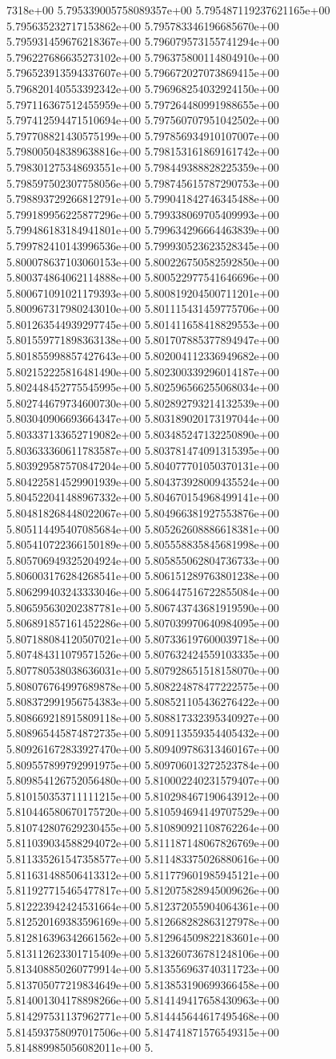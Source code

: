 7318e+00	5.795339005758089357e+00	5.795487119237621165e+00	5.795635232717153862e+00	5.795783346196685670e+00	5.795931459676218367e+00	5.796079573155741294e+00	5.796227686635273102e+00	5.796375800114804910e+00	5.796523913594337607e+00	5.796672027073869415e+00	5.796820140553392342e+00	5.796968254032924150e+00	5.797116367512455959e+00	5.797264480991988655e+00	5.797412594471510694e+00	5.797560707951042502e+00	5.797708821430575199e+00	5.797856934910107007e+00	5.798005048389638816e+00	5.798153161869161742e+00	5.798301275348693551e+00	5.798449388828225359e+00	5.798597502307758056e+00	5.798745615787290753e+00	5.798893729266812791e+00	5.799041842746345488e+00	5.799189956225877296e+00	5.799338069705409993e+00	5.799486183184941801e+00	5.799634296664463839e+00	5.799782410143996536e+00	5.799930523623528345e+00	5.800078637103060153e+00	5.800226750582592850e+00	5.800374864062114888e+00	5.800522977541646696e+00	5.800671091021179393e+00	5.800819204500711201e+00	5.800967317980243010e+00	5.801115431459775706e+00	5.801263544939297745e+00	5.801411658418829553e+00	5.801559771898363138e+00	5.801707885377894947e+00	5.801855998857427643e+00	5.802004112336949682e+00	5.802152225816481490e+00	5.802300339296014187e+00	5.802448452775545995e+00	5.802596566255068034e+00	5.802744679734600730e+00	5.802892793214132539e+00	5.803040906693664347e+00	5.803189020173197044e+00	5.803337133652719082e+00	5.803485247132250890e+00	5.803633360611783587e+00	5.803781474091315395e+00	5.803929587570847204e+00	5.804077701050370131e+00	5.804225814529901939e+00	5.804373928009435524e+00	5.804522041488967332e+00	5.804670154968499141e+00	5.804818268448022067e+00	5.804966381927553876e+00	5.805114495407085684e+00	5.805262608886618381e+00	5.805410722366150189e+00	5.805558835845681998e+00	5.805706949325204924e+00	5.805855062804736733e+00	5.806003176284268541e+00	5.806151289763801238e+00	5.806299403243333046e+00	5.806447516722855084e+00	5.806595630202387781e+00	5.806743743681919590e+00	5.806891857161452286e+00	5.807039970640984095e+00	5.807188084120507021e+00	5.807336197600039718e+00	5.807484311079571526e+00	5.807632424559103335e+00	5.807780538038636031e+00	5.807928651518158070e+00	5.808076764997689878e+00	5.808224878477222575e+00	5.808372991956754383e+00	5.808521105436276422e+00	5.808669218915809118e+00	5.808817332395340927e+00	5.808965445874872735e+00	5.809113559354405432e+00	5.809261672833927470e+00	5.809409786313460167e+00	5.809557899792991975e+00	5.809706013272523784e+00	5.809854126752056480e+00	5.810002240231579407e+00	5.810150353711111215e+00	5.810298467190643912e+00	5.810446580670175720e+00	5.810594694149707529e+00	5.810742807629230455e+00	5.810890921108762264e+00	5.811039034588294072e+00	5.811187148067826769e+00	5.811335261547358577e+00	5.811483375026880616e+00	5.811631488506413312e+00	5.811779601985945121e+00	5.811927715465477817e+00	5.812075828945009626e+00	5.812223942424531664e+00	5.812372055904064361e+00	5.812520169383596169e+00	5.812668282863127978e+00	5.812816396342661562e+00	5.812964509822183601e+00	5.813112623301715409e+00	5.813260736781248106e+00	5.813408850260779914e+00	5.813556963740311723e+00	5.813705077219834649e+00	5.813853190699366458e+00	5.814001304178898266e+00	5.814149417658430963e+00	5.814297531137962771e+00	5.814445644617495468e+00	5.814593758097017506e+00	5.814741871576549315e+00	5.814889985056082011e+00	5.